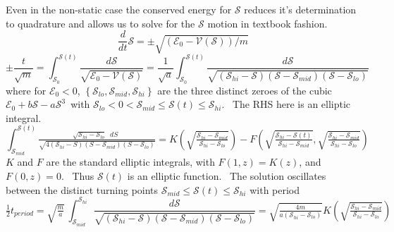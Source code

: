 \documentclass[a4paper,12pt]{article}%
\begin{document}
Even in the non-static case the conserved energy for $\mathcal{S}$ reduces
it's determination to quadrature and allows us to solve for the $\mathcal{S}$
motion in textbook fashion.%
\[
\frac{d}{dt}\mathcal{S=\pm}\sqrt{\left(  \mathcal{E}_{0}-\mathcal{V}\left(
\mathcal{S}\right)  \right)  /m}%
\]%
\[
\pm\frac{t}{\sqrt{m}}=\int_{\mathcal{S}_{0}}^{\mathcal{S}\left(  t\right)
}\frac{d\mathcal{S}}{\sqrt{\mathcal{E}_{0}-\mathcal{V}\left(  \mathcal{S}%
\right)  }}=\frac{1}{\sqrt{a}}\int_{\mathcal{S}_{0}}^{\mathcal{S}\left(
t\right)  }\frac{d\mathcal{S}}{\sqrt{\left(  \mathcal{S}_{hi}-\mathcal{S}%
\right)  \left(  \mathcal{S}-\mathcal{S}_{mid}\right)  \left(  \mathcal{S}%
-\mathcal{S}_{lo}\right)  }}%
\]
where for $\mathcal{E}_{0}<0$, $\left\{  \mathcal{S}_{lo},\mathcal{S}%
_{mid},\mathcal{S}_{hi}\right\}  $ are the three distinct zeroes of the cubic
$\mathcal{E}_{0}+b\mathcal{S}-a\mathcal{S}^{3}$\ with $\mathcal{S}%
_{lo}<0<\mathcal{S}_{mid}\leq\mathcal{S}\left(  t\right)  \leq\mathcal{S}%
_{hi}$. \ The RHS here is an elliptic integral.%
\[
\int_{\mathcal{S}_{mid}}^{\mathcal{S}\left(  t\right)  }\tfrac{\sqrt
{\mathcal{S}_{hi}-\mathcal{S}_{lo}}\;\;dS\;\;}{\sqrt{4\left(  \mathcal{S}%
_{hi}-S\right)  \left(  S-\mathcal{S}_{mid}\right)  \left(  S-\mathcal{S}%
_{lo}\right)  }}=K\left(  \sqrt{\tfrac{\mathcal{S}_{hi}-\mathcal{S}_{mid}%
}{\mathcal{S}_{hi}-\mathcal{S}_{lo}}}\right)  -F\left(  \sqrt{\tfrac
{\mathcal{S}_{hi}-\mathcal{S}\left(  t\right)  }{\mathcal{S}_{hi}%
-\mathcal{S}_{mid}}},\sqrt{\tfrac{\mathcal{S}_{hi}-\mathcal{S}_{mid}%
}{\mathcal{S}_{hi}-\mathcal{S}_{lo}}}\right)
\]
$K$ and $F$ are the standard elliptic integrals, with\textbf{ }$F\left(
1,z\right)  =K\left(  z\right)  $, and $F\left(  0,z\right)  =0$. \ Thus
$\mathcal{S}\left(  t\right)  $ is an elliptic function. \ The solution
oscillates between the distinct turning points $\mathcal{S}_{mid}%
\leq\mathcal{S}\left(  t\right)  \leq\mathcal{S}_{hi}$ with period%
\[
\tfrac{1}{2}t_{period}=\sqrt{\tfrac{m}{a}}\,\int_{\mathcal{S}_{mid}%
}^{\mathcal{S}_{hi}}\frac{d\mathcal{S}}{\sqrt{\left(  \mathcal{S}%
_{hi}-\mathcal{S}\right)  \left(  \mathcal{S}-\mathcal{S}_{mid}\right)
\left(  \mathcal{S}-\mathcal{S}_{lo}\right)  }}=\sqrt{\tfrac{4m}{a\left(
\mathcal{S}_{hi}-\mathcal{S}_{lo}\right)  }}K\left(  \sqrt{\tfrac
{\mathcal{S}_{hi}-\mathcal{S}_{mid}}{\mathcal{S}_{hi}-\mathcal{S}_{lo}}%
}\right)
\]
\end{document}
